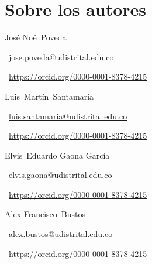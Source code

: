 \documentclass[12pt,twoside,spanish]{book}
\newcommand{\autorinfo}[4]{
  {\large\medseries\noindent #1}\par
  \noindent#2\par
  \faEnvelope~\url{#3}\par
  \textcolor{orcidlogocol}{\aiOrcid}~\url{#4}\par\vspace{1em}
}
\begin{document}
\chapter*{\lhseries Sobre los autores}

\autorinfo{José Noé~Poveda}{\lipsum[1]}{jose.poveda@udistrital.edu.co}{https://orcid.org/0000-0001-8378-4215}

\autorinfo{Luis~Martín~Santamaría}{\lipsum[1]}{luis.santamaria@udistrital.edu.co}{https://orcid.org/0000-0001-8378-4215}

\autorinfo{Elvis~Eduardo Gaona García}{\lipsum[1]}{elvis.gaona@udistrital.edu.co}{https://orcid.org/0000-0001-8378-4215}

\autorinfo{Alex Francisco~Bustos}{\lipsum[1]}{alex.bustos@udistrital.edu.co}{https://orcid.org/0000-0001-8378-4215}

\newpage

\end{document}
